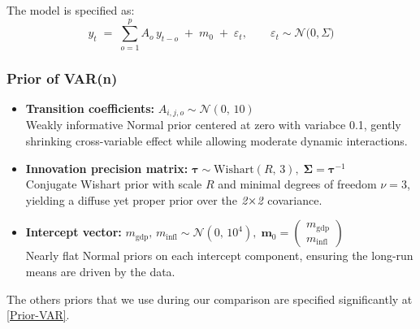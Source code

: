 \documentclass{Configuration_Files/PoliMi3i_thesis}
\begin{document}
The model is specified as:
\[
{y}_t
\;=\;
\sum_{o=1}^{p} A_{o}\,y_{t-o}
\;+\;
m_{0}
\;+\;
\varepsilon_t,
\qquad
\varepsilon_t \sim \mathcal{N}\bigl(0,\Sigma)
\]

\subsubsection{Prior of VAR(n)}
\begin{itemize}
    \item \textbf{Transition coefficients:}  
    $A_{i,j,o} \sim \mathcal{N}(0,\,10)$\\
    Weakly informative Normal prior centered at zero with variabce 0.1, gently shrinking cross-variable effect while allowing moderate dynamic interactions.
    \item \textbf{Innovation precision matrix:}  
    $\boldsymbol{\tau} \sim \mathrm{Wishart}(R,\,3),\;\boldsymbol{\Sigma}=\boldsymbol{\tau}^{-1}$\\
    Conjugate Wishart prior with scale \(R\) and minimal degrees of freedom \(\nu=3\), yielding a diffuse yet proper prior over the $\text{\itshape 2}\!\times\!\text{\itshape 2}$ covariance.
    \item \textbf{Intercept vector:}  
    $m_{\text{gdp}},\,m_{\text{infl}} \sim \mathcal{N}(0,\,10^4),\;\mathbf{m}_0=\begin{pmatrix}m_{\text{gdp}}\\m_{\text{infl}}\end{pmatrix}$\\
    Nearly flat Normal priors on each intercept component, ensuring the long-run means are driven by the data.
\end{itemize}
The others priors that we use during our comparison are specified significantly at \ref{Prior-VAR}.
\end{document}
